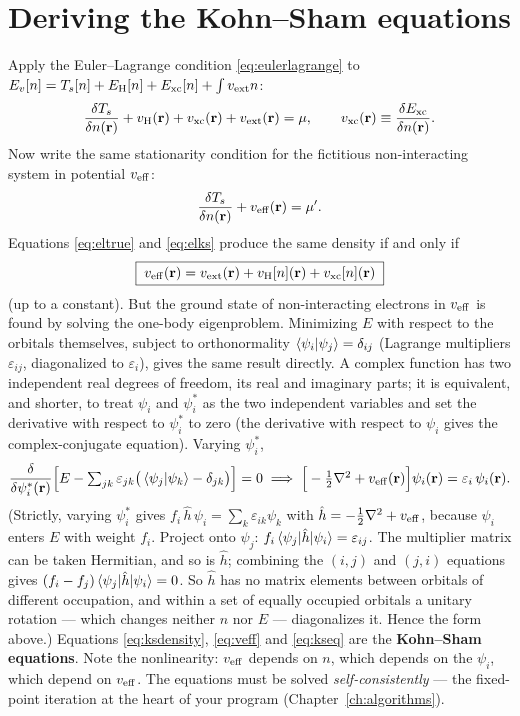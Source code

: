 \section{Deriving the Kohn--Sham equations}

Apply the Euler--Lagrange condition \eqref{eq:eulerlagrange} to
$E_v[n] = T_s[n] + E_{\mathrm H}[n] + E_{\mathrm{xc}}[n] + \int v_{\mathrm{ext}} n$:
\begin{equation}
\frac{\delta T_s}{\delta n(\mathbf{r})} + v_{\mathrm{H}}(\mathbf{r}) + v_{\mathrm{xc}}(\mathbf{r}) + v_{\mathrm{ext}}(\mathbf{r}) = \mu ,
\qquad
v_{\mathrm{xc}}(\mathbf{r}) \equiv \frac{\delta E_{\mathrm{xc}}}{\delta n(\mathbf{r})} .
\label{eq:eltrue}
\end{equation}
Now write the same stationarity condition for the fictitious non-interacting
system in potential $v_{\mathrm{eff}}$:
\begin{equation}
\frac{\delta T_s}{\delta n(\mathbf{r})} + v_{\mathrm{eff}}(\mathbf{r}) = \mu' .
\label{eq:elks}
\end{equation}
Equations \eqref{eq:eltrue} and \eqref{eq:elks} produce the same density if
and only if
\begin{equation}
\boxed{\;
v_{\mathrm{eff}}(\mathbf{r}) = v_{\mathrm{ext}}(\mathbf{r}) + v_{\mathrm{H}}[n](\mathbf{r}) + v_{\mathrm{xc}}[n](\mathbf{r})
\;}
\label{eq:veff}
\end{equation}
(up to a constant). But the ground state of non-interacting electrons in
$v_{\mathrm{eff}}$ is found by solving the one-body eigenproblem. Minimizing
$E$ with respect to the orbitals themselves, subject to orthonormality
$\braket{\psi_i|\psi_j} = \delta_{ij}$ (Lagrange multipliers
$\varepsilon_{ij}$, diagonalized to $\varepsilon_i$), gives the same result
directly. A complex function has two independent real degrees of freedom,
its real and imaginary parts; it is equivalent, and shorter, to treat
$\psi_i$ and $\psi_i^*$ as the two independent variables and set the
derivative with respect to $\psi_i^*$ to zero (the derivative with respect
to $\psi_i$ gives the complex-conjugate equation). Varying $\psi_i^*$,
\begin{equation}
\frac{\delta }{\delta \psi_i^*(\mathbf{r})}\Big[E - \textstyle\sum_{jk}
\varepsilon_{jk}\big(\braket{\psi_j|\psi_k} - \delta_{jk}\big)\Big] = 0
\;\Longrightarrow\;
\Big[-\tfrac12 \nabla^2 + v_{\mathrm{eff}}(\mathbf{r})\Big] \psi_i(\mathbf{r})
= \varepsilon_i\, \psi_i(\mathbf{r}).
\label{eq:kseq}
\end{equation}
(Strictly, varying $\psi_i^*$ gives
$f_i\,\hat h\,\psi_i = \sum_k \varepsilon_{ik}\psi_k$ with
$\hat h = -\tfrac12\nabla^2+v_{\mathrm{eff}}$, because $\psi_i$ enters $E$ with weight
$f_i$. Project onto $\psi_j$: $f_i\braket{\psi_j|\hat h|\psi_i} =
\varepsilon_{ij}$. The multiplier matrix can be taken Hermitian, and so is
$\hat h$; combining the $(i,j)$ and $(j,i)$ equations gives
$(f_i - f_j)\braket{\psi_j|\hat h|\psi_i} = 0$. So $\hat h$ has no matrix
elements between orbitals of different occupation, and within a set of
equally occupied orbitals a unitary rotation --- which changes neither $n$
nor $E$ --- diagonalizes it. Hence the form above.)
Equations \eqref{eq:ksdensity}, \eqref{eq:veff} and \eqref{eq:kseq} are the
\textbf{Kohn--Sham equations}. Note the nonlinearity: $v_{\mathrm{eff}}$ depends on $n$,
which depends on the $\psi_i$, which depend on $v_{\mathrm{eff}}$. The equations must be
solved \emph{self-consistently} --- the fixed-point iteration at the heart of
your program (Chapter~\ref{ch:algorithms}).

